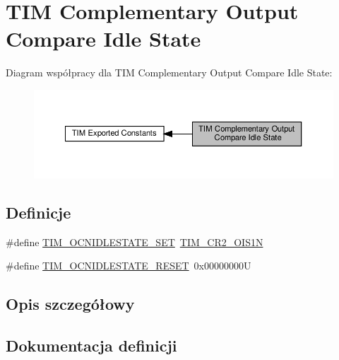 \hypertarget{group___t_i_m___output___compare___n___idle___state}{}\section{T\+IM Complementary Output Compare Idle State}
\label{group___t_i_m___output___compare___n___idle___state}
Diagram współpracy dla T\+IM Complementary Output Compare Idle State\+:\nopagebreak
\begin{figure}[H]
\begin{center}
\leavevmode
\includegraphics[width=350pt]{group___t_i_m___output___compare___n___idle___state}
\end{center}
\end{figure}
\subsection*{Definicje}
\begin{DoxyCompactItemize}
\item 
\#define \hyperlink{group___t_i_m___output___compare___n___idle___state_ga1f781774c71822b2502633dfc849c5ea}{T\+I\+M\+\_\+\+O\+C\+N\+I\+D\+L\+E\+S\+T\+A\+T\+E\+\_\+\+S\+ET}~\hyperlink{group___peripheral___registers___bits___definition_gae61f8d54923999fffb6db381e81f2b69}{T\+I\+M\+\_\+\+C\+R2\+\_\+\+O\+I\+S1N}
\item 
\#define \hyperlink{group___t_i_m___output___compare___n___idle___state_ga7586655652e3c3f1cb4af1ed59d25901}{T\+I\+M\+\_\+\+O\+C\+N\+I\+D\+L\+E\+S\+T\+A\+T\+E\+\_\+\+R\+E\+S\+ET}~0x00000000U
\end{DoxyCompactItemize}


\subsection{Opis szczegółowy}


\subsection{Dokumentacja definicji}
\mbox{\label{group___t_i_m___output___compare___n___idle___state_ga7586655652e3c3f1cb4af1ed59d25901}} 
